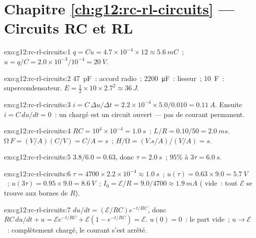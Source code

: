 \section*{Chapitre \ref{ch:g12:rc-rl-circuits} --- Circuits RC et RL}

\begin{solution}{exo:g12:rc-rl-circuits:1}
$q = Cu = 4.7\times10^{-4} \times 12 \approx \qty{5.6}{mC}$~;
$u = q/C = 2.0\times10^{-3}/10^{-4} = \qty{20}{V}$.
\end{solution}

\begin{solution}{exo:g12:rc-rl-circuits:2}
\qty{47}{pF}~: accord radio~; \qty{2200}{\micro F}~: lisseur~;
\qty{10}{F}~: supercondensateur. $E = \tfrac12 \times 10 \times 2.7^2
\approx \qty{36}{J}$.
\end{solution}

\begin{solution}{exo:g12:rc-rl-circuits:3}
$i = C\,\Delta u/\Delta t = 2.2\times10^{-4} \times 5.0/0.010 =
\qty{0.11}{A}$. Ensuite $i = C\,du/dt = 0$~: un
 chargé est un circuit ouvert --- pas de
courant permanent.
\end{solution}

\begin{solution}{exo:g12:rc-rl-circuits:4}
$RC = 10^4 \times 10^{-4} = \qty{1.0}{s}$~;
$L/R = 0.10/50 = \qty{2.0}{ms}$. $\unit{\ohm}\,\unit{F} =
(\unit{V/A})(\unit{C/V}) = \unit{C/A} = \unit{s}$~;
$\unit{H}/\unit{\ohm} = (\unit{V.s/A})/(\unit{V/A}) = \unit{s}$.
\end{solution}

\begin{solution}{exo:g12:rc-rl-circuits:5}
$3.8/6.0 = 0.63$, donc $\tau = \qty{2.0}{s}$~; $95\%$ à $3\tau =
\qty{6.0}{s}$.
\end{solution}

\begin{solution}{exo:g12:rc-rl-circuits:6}
$\tau = 4700 \times 2.2\times10^{-4} \approx \qty{1.0}{s}$~;
$u(\tau) = 0.63 \times 9.0 = \qty{5.7}{V}$~;
$u(3\tau) = 0.95 \times 9.0 = \qty{8.6}{V}$~;
$I_0 = \mathcal{E}/R = 9.0/4700 \approx \qty{1.9}{mA}$
( vide~: tout $\mathcal{E}$ se trouve aux
bornes de $R$).
\end{solution}

\begin{solution}{exo:g12:rc-rl-circuits:7}
$du/dt = (\mathcal{E}/RC)e^{-t/RC}$, donc $RC\,du/dt + u =
\mathcal{E}e^{-t/RC} + \mathcal{E}(1 - e^{-t/RC}) = \mathcal{E}$.
$u(0) = 0$~: le  part vide~;
$u \to \mathcal{E}$~: complètement chargé, le courant s'est arrêté.
\end{solution}

